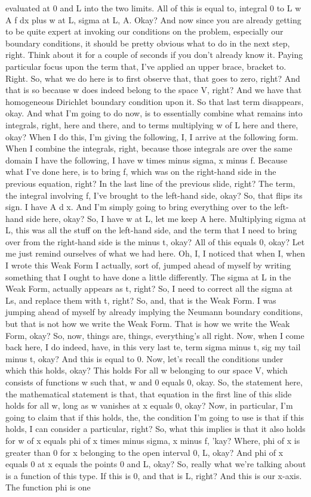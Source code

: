 \documentclass[10pt]{article}
\begin{document}
evaluated at 0 and L into the two limits. All of this is equal to, integral 0 to L w A f dx plus w at L, sigma at L, A. Okay? And now since you are already getting to be quite expert at invoking our conditions on the problem, especially our boundary conditions, it should be pretty obvious what to do in the next step, right. Think about it for a couple of seconds if you don't already know it. Paying particular focus upon the term that, I've applied an upper brace, bracket to. Right. So, what we do here is to first observe that, that goes to zero, right? And that is so because w does indeed belong to the space V, right? And we have that homogeneous Dirichlet boundary condition upon it. So that last term disappears, okay. And what I'm going to do now, is to essentially combine what remains into integrals, right, here and there, and to terms multiplying w of L here and there, okay? When I do this, I'm giving the following, I, I arrive at the following form. When I combine the integrals, right, because those integrals are over the same domain I have the following, I have w times minus sigma, x minus f. Because what I've done here, is to bring f, which was on the right-hand side in the previous equation, right? In the last line of the previous slide, right? The term, the integral involving f, I've brought to the left-hand side, okay? So, that flips its sign. I have A d x. And I'm simply going to bring everything over to the left-hand side here, okay? So, I have w at L, let me keep A here. Multiplying sigma at L, this was all the stuff on the left-hand side, and the term that I need to bring over from the right-hand side is the minus t, okay? All of this equals 0, okay? Let me just remind ourselves of what we had here. Oh, I, I noticed that when I, when I wrote this Weak Form I actually, sort of, jumped ahead of myself by writing something that I ought to have done a little differently. The sigma at L in the Weak Form, actually appears as t, right? So, I need to correct all the sigma at Ls, and replace them with t, right? So, and, that is the Weak Form. I was jumping ahead of myself by already implying the Neumann boundary conditions, but that is not how we write the Weak Form. That is how we write the Weak Form, okay? So, now, things are, things, everything's all right. Now, when I come back here, I do indeed, have, in this very last te, term sigma minus t, sig my tail minus t, okay? And this is equal to 0. Now, let's recall the conditions under which this holds, okay? This holds For all w belonging to our space V, which consists of functions w such that, w and 0 equals 0, okay. So, the statement here, the mathematical statement is that, that equation in the first line of this slide holds for all w, long as w vanishes at x equals 0, okay? Now, in particular, I'm going to claim that if this holds, the, the condition I'm going to use is that if this holds, I can consider a particular, right? So, what this implies is that it also holds for w of x equals phi of x times minus sigma, x minus f, 'kay? Where, phi of x is greater than 0 for x belonging to the open interval 0, L, okay? And phi of x equals 0 at x equals the points 0 and L, okay? So, really what we're talking about is a function of this type. If this is 0, and that is L, right? And this is our x-axis. The function phi is one 
\end{document}
